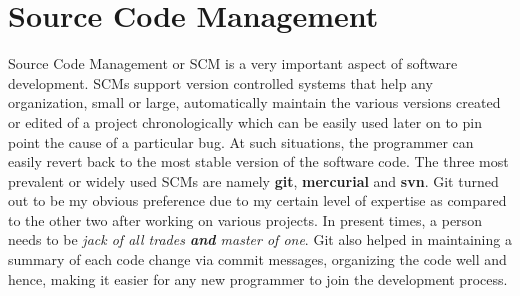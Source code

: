 \section{Source Code Management}
\label{sec:git}
Source Code Management or SCM is a very important aspect of software development. SCMs support version controlled systems that help any organization, small or large, automatically maintain the various versions created or edited of a project chronologically which can be easily used later on to pin point the cause of a particular bug. At such situations, the programmer can easily revert back to the most stable version of the software code. The three most prevalent or widely used SCMs are namely \textbf{git}, \textbf{mercurial} and \textbf{svn}. Git turned out to be my obvious preference due to my certain level of expertise as compared to the other two after working on various projects. In present times, a person needs to be \emph{jack of all trades \textbf{and} master of one}. Git also helped in maintaining a summary of each code change via commit messages, organizing the code well and hence, making it easier for any new programmer to join the development process.